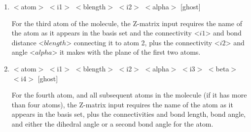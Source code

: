 \begin{enumerate}
   \item $<$atom$>$ $<$i1$>$ $<$blength$>$ $<$i2$>$ $<$alpha$>$ [ghost]

    For the third atom of the molecule, the Z-matrix input requires the
    name of the atom as it appears in the basis set and the connectivity 
    <$i1$> and bond distance 
    <$blength$> connecting it to atom 2, plus the connectivity <$i2$>
    and angle <$alpha$> it makes with the plane of the first two atoms. 

   \item $<$atom$>$ $<$i1$>$ $<$blength$>$ $<$i2$>$ $<$alpha$>$ $<$i3$>$ $<$beta$>$ $<$i4$>$ [ghost] %

    For the fourth atom, and all subsequent atoms in the molecule (if it
    has more than four atoms), the Z-matrix input requires the name 
    of the atom as it appears in the basis set,
    plus the connectivities and bond length,
    bond angle, and either the dihedral angle or a second bond angle
    for the atom.
        

\end{enumerate}
